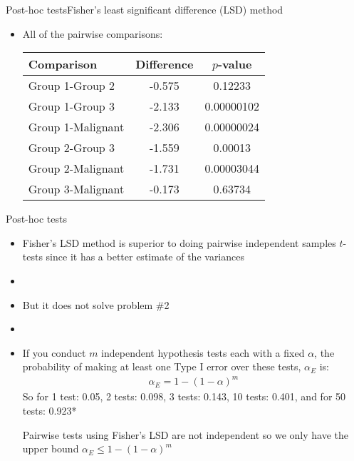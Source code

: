 \documentclass[xcolor=dvipsnames]{beamer}
\begin{document}
\begin{frame}{Post-hoc tests}{Fisher's least significant difference (LSD) method}
	\begin{itemize}
		\item All of the pairwise comparisons:
		\vspace{4mm}
		\begin{center}
			\begin{tabular}{|l|c|c|}
				\hline
				\textbf{Comparison} & \textbf{Difference} & $p$-value \\   \hline \hline    
				Group 1-Group 2  &  -0.575 &    0.12233    \\ \hline
				Group 1-Group 3 &   -2.133  & 0.00000102 \\ \hline
				Group 1-Malignant & -2.306 & 0.00000024 \\ \hline
				Group 2-Group 3  &  -1.559 &    0.00013 \\ \hline
				Group 2-Malignant  & -1.731 & 0.00003044 \\ \hline
				Group 3-Malignant & -0.173 &   0.63734 \\ \hline
			\end{tabular}
		\end{center}
	\end{itemize}
\end{frame}

\begin{frame}{Post-hoc tests}
\begin{itemize}
	\item Fisher's LSD method is superior to doing pairwise independent samples $t$-tests since it has a better estimate of the variances
	\item[]
	\item But it does not solve problem \#2
	\item[]
	\item If you conduct $m$ independent hypothesis tests each with a fixed $\alpha$, the probability of making at least one Type I error over these tests, $\alpha_E$ is: 
	\begin{gather*}
		\alpha_E = 1-(1-\alpha)^m
	\end{gather*}
	So for 1 test: 0.05, 2 tests: 0.098, 3 tests: 0.143, 10 tests: 0.401, and for 50 tests: 0.923*
	
	\vspace{1mm}
	{\tiny *Pairwise tests using Fisher's LSD are not independent so we only have the upper bound $\alpha_E\leq 1-(1-\alpha)^m$}
\end{itemize}
\end{frame}
\end{document}
